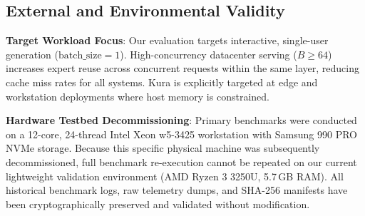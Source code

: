 \subsection{External and Environmental Validity}
\textbf{Target Workload Focus}: Our evaluation targets interactive, single-user generation ($\text{batch\_size} = 1$). High-concurrency datacenter serving ($B \ge 64$) increases expert reuse across concurrent requests within the same layer, reducing cache miss rates for all systems. Kura is explicitly targeted at edge and workstation deployments where host memory is constrained.

\textbf{Hardware Testbed Decommissioning}: Primary benchmarks were conducted on a 12-core, 24-thread Intel Xeon w5-3425 workstation with Samsung 990 PRO NVMe storage. Because this specific physical machine was subsequently decommissioned, full benchmark re-execution cannot be repeated on our current lightweight validation environment (AMD Ryzen 3 3250U, 5.7\,GB RAM). All historical benchmark logs, raw telemetry dumps, and SHA-256 manifests have been cryptographically preserved and validated without modification.
